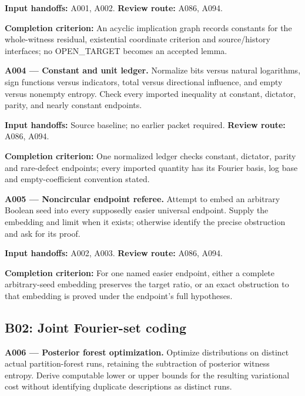 \documentclass[11pt]{article}
\begin{document}
{\small\color{ink}\textbf{Input handoffs:} A001, A002. \textbf{Review route:} A086, A094.\par
\textbf{Completion criterion:} An acyclic implication graph records constants for the whole-witness residual, existential coordinate criterion and source/history interfaces; no OPEN\_TARGET becomes an accepted lemma.\par}



\textbf{A004 --- Constant and unit ledger.} Normalize bits versus natural logarithms, sign functions versus indicators, total versus directional influence, and empty versus nonempty entropy. Check every imported inequality at constant, dictator, parity, and nearly constant endpoints.

{\small\color{ink}\textbf{Input handoffs:} Source baseline; no earlier packet required. \textbf{Review route:} A086, A094.\par
\textbf{Completion criterion:} One normalized ledger checks constant, dictator, parity and rare-defect endpoints; every imported quantity has its Fourier basis, log base and empty-coefficient convention stated.\par}



\textbf{A005 --- Noncircular endpoint referee.} Attempt to embed an arbitrary Boolean seed into every supposedly easier universal endpoint. Supply the embedding and limit when it exists; otherwise identify the precise obstruction and ask for its proof.

{\small\color{ink}\textbf{Input handoffs:} A002, A003. \textbf{Review route:} A086, A094.\par
\textbf{Completion criterion:} For one named easier endpoint, either a complete arbitrary-seed embedding preserves the target ratio, or an exact obstruction to that embedding is proved under the endpoint's full hypotheses.\par}



\subsection{B02: Joint Fourier-set coding}

\textbf{A006 --- Posterior forest optimization.} Optimize distributions on distinct actual partition-forest runs, retaining the subtraction of posterior witness entropy. Derive computable lower or upper bounds for the resulting variational cost without identifying duplicate descriptions as distinct runs.
\end{document}
